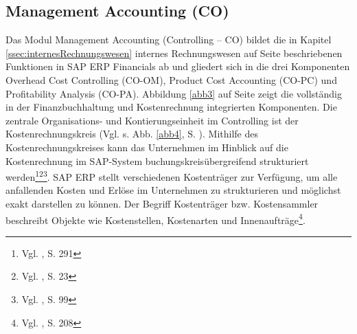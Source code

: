 \subsection{Management Accounting (CO)} %
Das Modul Management Accounting (Controlling -- CO) bildet die in Kapitel \ref{ssec:internesRechnungswesen} internes Rechnungswesen auf Seite \pageref{ssec:internesRechnungswesen} beschriebenen Funktionen in SAP ERP Financials ab und gliedert sich in die drei Komponenten Overhead Cost Controlling (CO-OM), Product Cost Accounting (CO-PC) und Profitability Analysis (CO-PA). Abbildung \ref{abb3} auf Seite \pageref{abb3} zeigt die vollständig in der Finanzbuchhaltung und Kostenrechnung integrierten Komponenten. 
Die zentrale Organisations- und Kontierungseinheit im Controlling ist der Kostenrechnungskreis (Vgl. s. Abb. \ref{abb4}, S. \pageref{abb4}). Mithilfe des Kostenrechnungskreises kann das Unternehmen im Hinblick auf die Kostenrechnung im SAP-System buchungskreisübergreifend strukturiert werden\footnote{Vgl. \cite{Patel2009}, S. 291}\footnote{Vgl. \cite{Friedl2008}, S. 23}\footnote{Vgl. \cite{Klein2010}, S. 99}. SAP ERP stellt verschiedenen Kostenträger zur Verfügung, um alle anfallenden Kosten und Erlöse im Unternehmen zu strukturieren und möglichst exakt darstellen zu können. Der Begriff Kostenträger bzw. Kostensammler beschreibt Objekte wie Kostenstellen, Kostenarten und Innenaufträge\footnote{Vgl. \cite{Patel2009}, S. 208}. 
